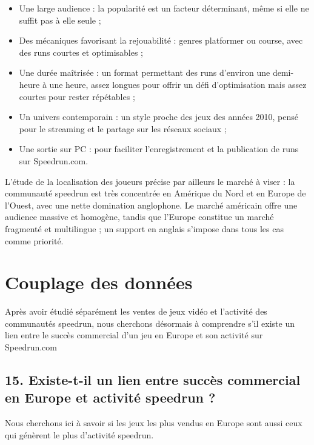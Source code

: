 \documentclass[
]{article}
\providecommand{\tightlist}{%
  \setlength{\itemsep}{0pt}\setlength{\parskip}{0pt}}
\begin{document}
\begin{itemize}
\tightlist
\item
  Une large audience : la popularité est un facteur déterminant, même si
  elle ne suffit pas à elle seule ;
\item
  Des mécaniques favorisant la rejouabilité : genres platformer ou
  course, avec des runs courtes et optimisables ;
\item
  Une durée maîtrisée : un format permettant des runs d'environ une
  demi-heure à une heure, assez longues pour offrir un défi
  d'optimisation mais assez courtes pour rester répétables ;
\item
  Un univers contemporain : un style proche des jeux des années 2010,
  pensé pour le streaming et le partage sur les réseaux sociaux ;
\item
  Une sortie sur PC : pour faciliter l'enregistrement et la publication
  de runs sur Speedrun.com.
\end{itemize}

L'étude de la localisation des joueurs précise par ailleurs le marché à
viser : la communauté speedrun est très concentrée en Amérique du Nord
et en Europe de l'Ouest, avec une nette domination anglophone. Le marché
américain offre une audience massive et homogène, tandis que l'Europe
constitue un marché fragmenté et multilingue ; un support en anglais
s'impose dans tous les cas comme priorité.

\newpage

\section{Couplage des données}\label{couplage-des-donnuxe9es}

Après avoir étudié séparément les ventes de jeux vidéo et l'activité des
communautés speedrun, nous cherchons désormais à comprendre s'il existe
un lien entre le succès commercial d'un jeu en Europe et son activité
sur Speedrun.com

\subsection{15. Existe-t-il un lien entre succès commercial en Europe et
activité speedrun
?}\label{existe-t-il-un-lien-entre-succuxe8s-commercial-en-europe-et-activituxe9-speedrun}

Nous cherchons ici à savoir si les jeux les plus vendus en Europe sont
aussi ceux qui génèrent le plus d'activité speedrun.
\end{document}
